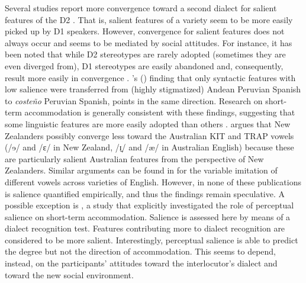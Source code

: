\documentclass[output=paper]{langscibook}
\begin{document}
Several studies report more convergence toward a second dialect for salient features of the D2 \citep{auer_subjective_1998,pesqueira_cambio_2008,wilson_types_2011,romera_prosodic_2013}. That is, salient features of a variety seem to be more easily picked up by D1 speakers. 
However, convergence for salient features does not always occur and seems to be mediated by social attitudes. For instance, it has been noted that while D2 stereotypes are rarely adopted (sometimes they are even diverged from), D1 stereotypes are easily abandoned and, consequently, result more easily in convergence \citep{trudgill_dialects_1986,erker_contact_2016}. \citeauthor{Escobar2007}'s (\citeyear{Escobar2007}) finding that only syntactic features with low salience were transferred from (highly stigmatized) Andean Peruvian Spanish to \textit{costeño} Peruvian Spanish, points in the same direction. Research on short-term accommodation is generally consistent with these findings, suggesting that some linguistic features are more easily adopted than others \citep{babel_dialect_2010,walker_repeat_2015}. \citet{babel_dialect_2010} argues that New Zealanders possibly converge less toward the Australian KIT and TRAP vowels (/ɘ/ and /ɛ/ in New Zealand, /ɪ̠/ and /æ/ in Australian English) because these are particularly salient Australian features from the perspective of New Zealanders. Similar arguments can be found in \citet{walker_repeat_2015} for the variable imitation of different vowels across varieties of English. However, in none of these publications is salience quantified empirically, and thus the findings remain speculative. A possible exception is \textcite{macleod_effect_2012}, a study that explicitly investigated the role of perceptual salience on short-term accommodation. Salience is assessed here by means of a dialect recognition test. Features contributing more to dialect recognition are considered to be more salient. Interestingly, perceptual salience is able to predict the degree but not the direction of accommodation. This  seems to depend, instead, on the participants' attitudes toward the interlocutor's dialect and toward the new social environment.
\end{document}
